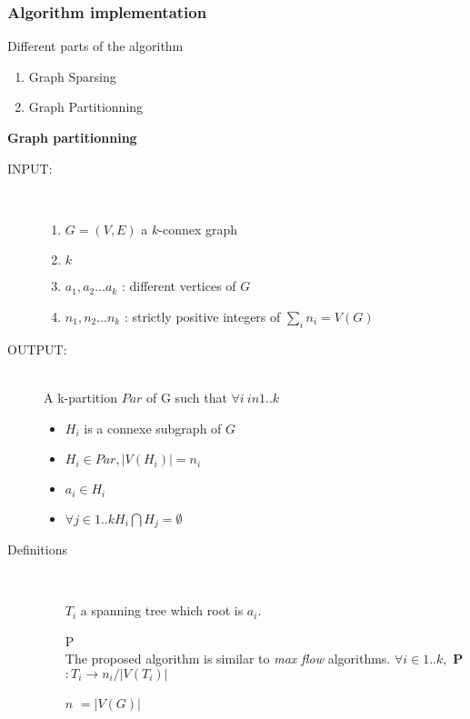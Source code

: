 \documentclass[xcolor=dvipsnames]{beamer}
\begin{document}
\begin{frame}
  \frametitle{Algorithm implementation}
  Different parts of the algorithm
  	\begin{enumerate}
    \item Graph Sparsing
	\item Graph Partitionning
    \end{enumerate}
	
	{\bfseries Graph partitionning}\\
    	 \begin{description}
		\item [INPUT:] \hfill \\
		        \begin{enumerate}
        			\item $G = (V, E)$ a $k$-connex graph 
            		\item $k$
            		\item $a_1, a_2 \ldots a_k$ : different vertices of $G$
            		\item $n_1, n_2 \ldots n_k$ : strictly positive integers of $\sum_i n_i =  V(G)$
        		       \end{enumerate}
	\end{description}
\end{frame}
\begin{frame}
    	 \begin{description}
		\item[OUTPUT:] \hfill \\
			A k-partition $Par$ of G such that $\forall i \ in 1..k$ 
			\begin{itemize} 
				\item $H_i$ is a connexe subgraph of $G$
				\item $H_i \in Par, |V(H_i)| = n_i $
				\item $a_i \in H_i $
				\item $\forall j \in 1..k H_i \bigcap H_j = \emptyset$
			\end{itemize}
	\end{description}
\end{frame}

\begin{frame}
	\begin{description}
    	\item[Definitions] \hfill \\
    	\begin{itemize}
    		\item [$T_i$] a spanning tree which root is $a_i$.
			\item[P] \hfill \\
    		The proposed algorithm is similar to \emph{max flow} algorithms.
	 		$\forall i \in 1..k,$ \bfseries P $: T_i \rightarrow n_i/|V(T_i)|$
		\item [$n$] $= |V(G)|$
    	\end{itemize}
    \end{description}
\end{frame}
\end{document}
